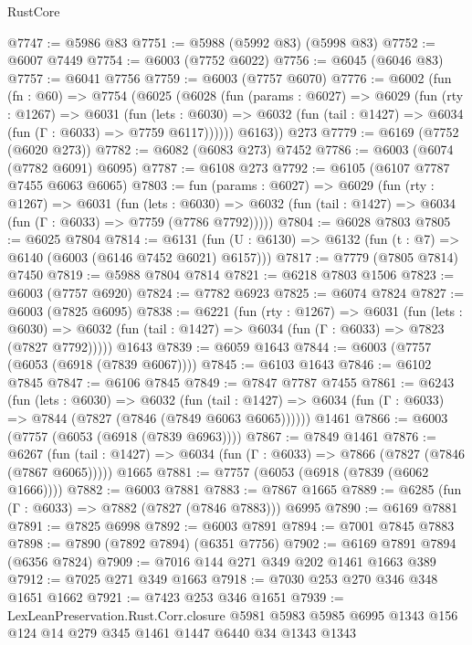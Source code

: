\begin{lexlean}{RustCore}
\begin{coremodule}
@7747 := @5986 @83
@7751 := @5988 (@5992 @83) (@5998 @83)
@7752 := @6007 @7449
@7754 := @6003 (@7752 @6022)
@7756 := @6045 (@6046 @83)
@7757 := @6041 @7756
@7759 := @6003 (@7757 @6070)
@7776 := @6002
    (fun (fn : @60) =>
    @7754
      (@6025
        (@6028
          (fun (params : @6027) =>
          @6029
            (fun (rty : @1267) =>
            @6031
              (fun (lets : @6030) =>
              @6032 (fun (tail : @1427) => @6034 (fun (Γ : @6033) => @7759 @6117))))))
        @6163))
    @273
@7779 := @6169 (@7752 (@6020 @273))
@7782 := @6082 (@6083 @273) @7452
@7786 := @6003 (@6074 (@7782 @6091) @6095)
@7787 := @6108 @273
@7792 := @6105 (@6107 @7787 @7455 @6063 @6065)
@7803 := fun (params : @6027) =>
  @6029
    (fun (rty : @1267) =>
    @6031
      (fun (lets : @6030) =>
      @6032 (fun (tail : @1427) => @6034 (fun (Γ : @6033) => @7759 (@7786 @7792)))))
@7804 := @6028 @7803
@7805 := @6025 @7804
@7814 := @6131 (fun (U : @6130) => @6132 (fun (t : @7) => @6140 (@6003 (@6146 @7452 @6021) @6157)))
@7817 := @7779 (@7805 @7814) @7450
@7819 := @5988 @7804 @7814
@7821 := @6218 @7803 @1506
@7823 := @6003 (@7757 @6920)
@7824 := @7782 @6923
@7825 := @6074 @7824
@7827 := @6003 (@7825 @6095)
@7838 := @6221
    (fun (rty : @1267) =>
    @6031
      (fun (lets : @6030) =>
      @6032 (fun (tail : @1427) => @6034 (fun (Γ : @6033) => @7823 (@7827 @7792)))))
    @1643
@7839 := @6059 @1643
@7844 := @6003 (@7757 (@6053 (@6918 (@7839 @6067))))
@7845 := @6103 @1643
@7846 := @6102 @7845
@7847 := @6106 @7845
@7849 := @7847 @7787 @7455
@7861 := @6243
    (fun (lets : @6030) =>
    @6032
      (fun (tail : @1427) => @6034 (fun (Γ : @6033) => @7844 (@7827 (@7846 (@7849 @6063 @6065))))))
    @1461
@7866 := @6003 (@7757 (@6053 (@6918 (@7839 @6963))))
@7867 := @7849 @1461
@7876 := @6267
    (fun (tail : @1427) => @6034 (fun (Γ : @6033) => @7866 (@7827 (@7846 (@7867 @6065)))))
    @1665
@7881 := @7757 (@6053 (@6918 (@7839 (@6062 @1666))))
@7882 := @6003 @7881
@7883 := @7867 @1665
@7889 := @6285 (fun (Γ : @6033) => @7882 (@7827 (@7846 @7883))) @6995
@7890 := @6169 @7881
@7891 := @7825 @6998
@7892 := @6003 @7891
@7894 := @7001 @7845 @7883
@7898 := @7890 (@7892 @7894) (@6351 @7756)
@7902 := @6169 @7891 @7894 (@6356 @7824)
@7909 := @7016 @144 @271 @349 @202 @1461 @1663 @389
@7912 := @7025 @271 @349 @1663
@7918 := @7030 @253 @270 @346 @348 @1651 @1662
@7921 := @7423 @253 @346 @1651
@7939 := LexLeanPreservation.Rust.Corr.closure
    @5981
    @5983
    @5985
    @6995
    @1343
    @156
    @124
    @14
    @279
    @345
    @1461
    @1447
    @6440
    @34
    @1343
    @1343

\end{coremodule}
\end{lexlean}
